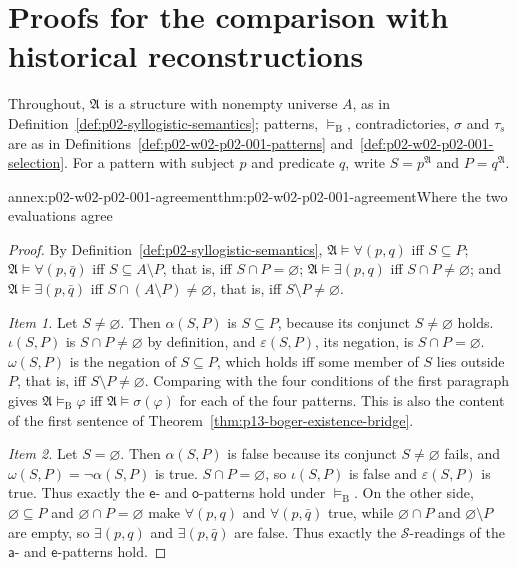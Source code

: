 \section{Proofs for the comparison with historical reconstructions}
\label{sec:annex-p02-w02-p02-001-historical-contrast}

Throughout, \(\mathfrak A\) is a structure with nonempty universe \(A\), as
in Definition~\ref{def:p02-syllogistic-semantics}; patterns, \(\models_{\mathrm B}\),
contradictories, \(\sigma\) and \(\tau_s\) are as in
Definitions~\ref{def:p02-w02-p02-001-patterns}
and~\ref{def:p02-w02-p02-001-selection}. For a pattern with subject \(p\)
and predicate \(q\), write \(S=p^{\mathfrak A}\) and \(P=q^{\mathfrak A}\).

\begin{annexitem}{annex:p02-w02-p02-001-agreement}{thm:p02-w02-p02-001-agreement}{Where the two evaluations agree}
\begin{proof}
By Definition~\ref{def:p02-syllogistic-semantics},
\(\mathfrak A\models\forall(p,q)\) iff \(S\subseteq P\);
\(\mathfrak A\models\forall(p,\bar q)\) iff \(S\subseteq A\setminus P\), that
is, iff \(S\cap P=\varnothing\);
\(\mathfrak A\models\exists(p,q)\) iff \(S\cap P\ne\varnothing\); and
\(\mathfrak A\models\exists(p,\bar q)\) iff \(S\cap(A\setminus P)\ne\varnothing\),
that is, iff \(S\setminus P\ne\varnothing\).

\emph{Item 1.} Let \(S\ne\varnothing\). Then \(\alpha(S,P)\) is
\(S\subseteq P\), because its conjunct \(S\ne\varnothing\) holds.
\(\iota(S,P)\) is \(S\cap P\ne\varnothing\) by definition, and
\(\varepsilon(S,P)\), its negation, is \(S\cap P=\varnothing\).
\(\omega(S,P)\) is the negation of \(S\subseteq P\), which holds iff some
member of \(S\) lies outside \(P\), that is, iff \(S\setminus P\ne\varnothing\).
Comparing with the four conditions of the first paragraph gives
\(\mathfrak A\models_{\mathrm B}\varphi\) iff \(\mathfrak A\models\sigma(\varphi)\)
for each of the four patterns. This is also the content of the first
sentence of Theorem~\ref{thm:p13-boger-existence-bridge}.

\emph{Item 2.} Let \(S=\varnothing\). Then \(\alpha(S,P)\) is false because
its conjunct \(S\ne\varnothing\) fails, and \(\omega(S,P)=\neg\alpha(S,P)\)
is true. \(S\cap P=\varnothing\), so \(\iota(S,P)\) is false and
\(\varepsilon(S,P)\) is true. Thus exactly the \(\mathsf e\)- and
\(\mathsf o\)-patterns hold under \(\models_{\mathrm B}\). On the other side,
\(\varnothing\subseteq P\) and \(\varnothing\cap P=\varnothing\) make
\(\forall(p,q)\) and \(\forall(p,\bar q)\) true, while
\(\varnothing\cap P\) and \(\varnothing\setminus P\) are empty, so
\(\exists(p,q)\) and \(\exists(p,\bar q)\) are false. Thus exactly the
\(\mathcal S\)-readings of the \(\mathsf a\)- and \(\mathsf e\)-patterns
hold.


\end{proof}
\end{annexitem}
